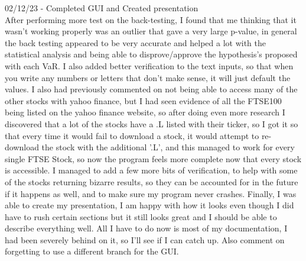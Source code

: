 \documentclass{article}
\begin{document}
02/12/23 - Completed GUI and Created presentation\\
After performing more test on the back-testing, I found that me thinking that it wasn't working properly was an outlier that gave a very large p-value, in general the back testing appeared to be very accurate and helped a lot with the statistical analysis and being able to disprove/approve the hypothesis's proposed with each VaR. I also added better verification to the text inputs, so that when you write any numbers or letters that don't make sense, it will just default the values. I also had previously commented on not being able to access many of the other stocks with yahoo finance, but I had seen evidence of all the FTSE100 being listed on the yahoo finance website, so after doing even more research I discovered that a lot of the stocks have a .L listed with their ticker, so I got it so that every time it would fail to download a stock, it would attempt to re-download the stock with the additional '.L', and this managed to work for every single FTSE Stock, so now the program feels more complete now that every stock is accessible. I managed to add a few more bits of verification, to help with some of the stocks returning bizarre results, so they can be accounted for in the future if it happens as well, and to make sure my program never crashes. Finally, I was able to create my presentation, I am happy with how it looks even though I did have to rush certain sections but it still looks great and I should be able to describe everything well. All I have to do now is most of my documentation, I had been severely behind on it, so I'll see if I can catch up. Also comment on forgetting to use a different branch for the GUI.\\\vspace{0.3cm}
\end{document}
